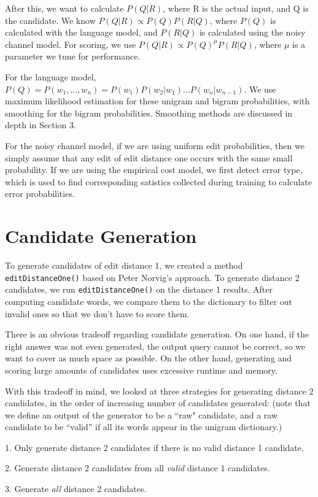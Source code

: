 \documentclass[10pt,twocolumn]{article}
\begin{document}
After this, we want to calculate $P(Q|R)$, where R is the actual input, and Q is the candidate. We know $P(Q|R)\propto P(Q)P(R|Q)$, where $P(Q)$ is calculated with the language model, and $P(R|Q)$ is calculated using the noisy channel model. For scoring, we use $P(Q|R)\propto P(Q)^\mu P(R|Q)$, where $\mu$ is a parameter we tune for performance.

For the language model, $P(Q)=P(w_1,\dots,w_n)=P(w_1)P(w_2|w_1)\dots P(w_n|w_{n-1})$. We use maximum likelihood estimation for these unigram and bigram probabilities, with smoothing for the bigram probabilities. Smoothing methods are discussed in depth in Section 3.

For the noisy channel model, if we are using uniform edit probabilities, then we simply assume that any edit of edit distance one occurs with the same small probability. If we are using the empirical cost model, we first detect error type, which is used to find corresponding satistics collected during training to calculate error probabilities.
\section{Candidate Generation}
To generate candidates of edit distance 1, we created a method \texttt{editDistanceOne()} based on Peter Norvig's approach. To generate distance 2 candidates, we run \texttt{editDistanceOne()} on the distance 1 results. After computing candidate words, we compare them to the dictionary to filter out invalid ones so that we don't have to score them.
 
There is an obvious tradeoff regarding candidate generation. On one hand, if the right answer was not even generated, the output query cannot be correct, so we want to cover as much space as possible. On the other hand, generating and scoring large amounts of candidates uses excessive runtime and memory.

With this tradeoff in mind, we looked at three strategies for generating distance 2 candidates, in the order of increasing number of candidates generated: (note that we define an output of the generator to be a ``raw" candidate, and a raw candidate to be ``valid'' if all its words appear in the unigram dictionary.)

1. Only generate distance 2 candidates if there is no valid distance 1 candidate.

2. Generate distance 2 candidates from all {\it valid} distance 1 candidates.

3. Generate {\it all} distance 2 candidates.
\end{document}
